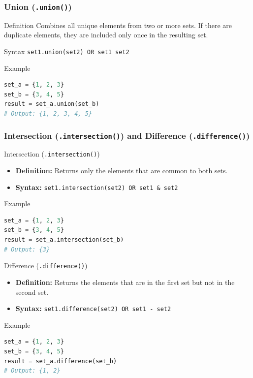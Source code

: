 \documentclass{beamer}
\begin{document}
\begin{frame}[fragile]
    \frametitle{Union (\texttt{.union()})}
    \begin{block}{Definition}
        Combines all unique elements from two or more sets. If there are duplicate elements, they are included only once in the resulting set.
    \end{block}
    \begin{block}{Syntax}
        \texttt{set1.union(set2) OR set1 \textbar{} set2}
    \end{block}
    
    \begin{block}{Example}
    \begin{lstlisting}[language=Python]
set_a = {1, 2, 3}
set_b = {3, 4, 5}
result = set_a.union(set_b)
# Output: {1, 2, 3, 4, 5}
    \end{lstlisting}
    \end{block}
\end{frame}

\begin{frame}[fragile]
    \frametitle{Intersection (\texttt{.intersection()}) and Difference (\texttt{.difference()})}
    \begin{block}{Intersection (\texttt{.intersection()})}
        \begin{itemize}
            \item \textbf{Definition:} Returns only the elements that are common to both sets.
            \item \textbf{Syntax:} \texttt{set1.intersection(set2) OR set1 \& set2}
        \end{itemize}
        \begin{block}{Example}
        \begin{lstlisting}[language=Python]
set_a = {1, 2, 3}
set_b = {3, 4, 5}
result = set_a.intersection(set_b)
# Output: {3}
        \end{lstlisting}
        \end{block}
    \end{block}

    \begin{block}{Difference (\texttt{.difference()})}
        \begin{itemize}
            \item \textbf{Definition:} Returns the elements that are in the first set but not in the second set.
            \item \textbf{Syntax:} \texttt{set1.difference(set2) OR set1 - set2}
        \end{itemize}
        \begin{block}{Example}
        \begin{lstlisting}[language=Python]
set_a = {1, 2, 3}
set_b = {3, 4, 5}
result = set_a.difference(set_b)
# Output: {1, 2}
        \end{lstlisting}
        \end{block}
    \end{block}
\end{frame}
\end{document}
